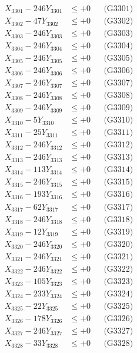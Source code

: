 \documentclass[a4paper,10pt]{article}
\begin{document}
{\begin{align}
\allowbreak
X_{3301} - 246Y_{3301} &\leq +0 && \text{(G3301)} \\
X_{3302} - 47Y_{3302} &\leq +0 && \text{(G3302)} \\
X_{3303} - 246Y_{3303} &\leq +0 && \text{(G3303)} \\
X_{3304} - 246Y_{3304} &\leq +0 && \text{(G3304)} \\
X_{3305} - 246Y_{3305} &\leq +0 && \text{(G3305)} \\
X_{3306} - 246Y_{3306} &\leq +0 && \text{(G3306)} \\
X_{3307} - 246Y_{3307} &\leq +0 && \text{(G3307)} \\
X_{3308} - 246Y_{3308} &\leq +0 && \text{(G3308)} \\
X_{3309} - 246Y_{3309} &\leq +0 && \text{(G3309)} \\
X_{3310} - 5Y_{3310} &\leq +0 && \text{(G3310)} \\
\allowbreak
X_{3311} - 25Y_{3311} &\leq +0 && \text{(G3311)} \\
X_{3312} - 246Y_{3312} &\leq +0 && \text{(G3312)} \\
X_{3313} - 246Y_{3313} &\leq +0 && \text{(G3313)} \\
X_{3314} - 113Y_{3314} &\leq +0 && \text{(G3314)} \\
X_{3315} - 246Y_{3315} &\leq +0 && \text{(G3315)} \\
X_{3316} - 193Y_{3316} &\leq +0 && \text{(G3316)} \\
X_{3317} - 62Y_{3317} &\leq +0 && \text{(G3317)} \\
X_{3318} - 246Y_{3318} &\leq +0 && \text{(G3318)} \\
X_{3319} - 12Y_{3319} &\leq +0 && \text{(G3319)} \\
X_{3320} - 246Y_{3320} &\leq +0 && \text{(G3320)} \\
\allowbreak
X_{3321} - 246Y_{3321} &\leq +0 && \text{(G3321)} \\
X_{3322} - 246Y_{3322} &\leq +0 && \text{(G3322)} \\
X_{3323} - 105Y_{3323} &\leq +0 && \text{(G3323)} \\
X_{3324} - 233Y_{3324} &\leq +0 && \text{(G3324)} \\
X_{3325} - 22Y_{3325} &\leq +0 && \text{(G3325)} \\
X_{3326} - 178Y_{3326} &\leq +0 && \text{(G3326)} \\
X_{3327} - 246Y_{3327} &\leq +0 && \text{(G3327)} \\
X_{3328} - 33Y_{3328} &\leq +0 && \text{(G3328)} \\

\end{align}}
\end{document}
